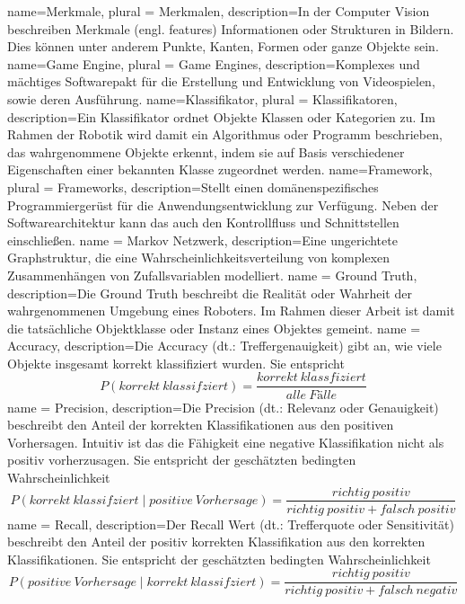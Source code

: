 {
  name=Merkmale,
  plural = {Merkmalen},
  description={In der Computer Vision beschreiben Merkmale (engl. features) Informationen oder Strukturen in Bildern. Dies können unter anderem Punkte, Kanten, Formen oder ganze Objekte sein.}
}
{
  name=Game Engine,
  plural = {Game Engines},
  description={Komplexes und mächtiges Softwarepakt für die Erstellung und Entwicklung von Videospielen, sowie deren Ausführung.}
}
{
  name=Klassifikator,
  plural = {Klassifikatoren},
  description={Ein Klassifikator ordnet Objekte Klassen oder Kategorien zu. Im Rahmen der Robotik wird damit ein Algorithmus oder Programm beschrieben, das wahrgenommene Objekte erkennt, indem sie auf Basis verschiedener Eigenschaften einer bekannten Klasse zugeordnet werden.}
}
{
  name=Framework,
  plural = {Frameworks},
  description={Stellt einen domänenspezifisches Programmiergerüst für die Anwendungsentwicklung zur Verfügung. Neben der Softwarearchitektur kann das auch den Kontrollfluss und Schnittstellen einschließen.}
}
{
  name = {Markov Netzwerk},
  description={Eine ungerichtete Graphstruktur, die eine Wahrscheinlichkeitsverteilung von komplexen Zusammenhängen von Zufallsvariablen modelliert.}
}
{
  name = {Ground Truth},
  description={Die Ground Truth beschreibt die Realität oder Wahrheit der wahrgenommenen Umgebung eines Roboters. Im Rahmen dieser Arbeit ist damit die tatsächliche Objektklasse oder Instanz eines Objektes gemeint.}
}
{
  name = {Accuracy},
  description={Die Accuracy (dt.: Treffergenauigkeit) gibt an, wie viele Objekte insgesamt korrekt klassifiziert wurden. Sie entspricht \begin{displaymath}
P(korrekt\ klassifziert) = \frac{korrekt\ klassfiziert}{alle\ Fälle} 
\end{displaymath}}
}
{
  name = {Precision},
  description={Die Precision (dt.: Relevanz oder Genauigkeit) beschreibt den Anteil der korrekten Klassifikationen aus den positiven Vorhersagen. Intuitiv ist das die Fähigkeit eine negative Klassifikation nicht als positiv vorherzusagen. Sie entspricht der geschätzten bedingten Wahrscheinlichkeit \begin{displaymath}
P(korrekt\ klassifziert \mid positive\ Vorhersage) = \frac{richtig\ positiv}{richtig\ positiv + falsch\ positiv}
\end{displaymath}}
}
{
  name = {Recall},
  description={Der Recall Wert (dt.: Trefferquote oder Sensitivität) beschreibt den Anteil der positiv korrekten Klassifikation aus den korrekten Klassifikationen. Sie entspricht der geschätzten bedingten Wahrscheinlichkeit \begin{displaymath}
P(positive\ Vorhersage \mid korrekt\ klassifziert) = \frac{richtig\ positiv}{richtig\ positiv + falsch\ negativ}
\end{displaymath}}
}
